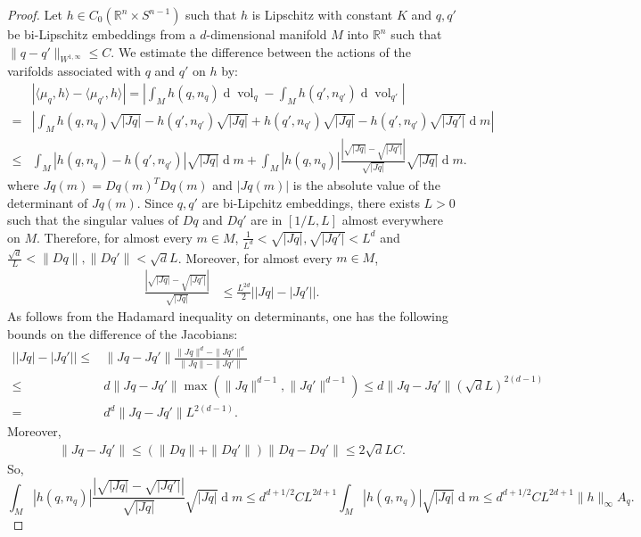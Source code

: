 \documentclass[11pt]{article}
\newcommand{\R}{\mathbb{R}}
\begin{document}
\begin{proof}
    Let $h\in C_0(\R^n\times S^{n-1})$ such that $h$ is Lipschitz with constant $K$ and $q,q'$ be bi-Lipschitz embeddings from a $d$-dimensional manifold $M$ into $\R^{n}$ such that $\|q - q'\|_{W^{1,\infty}} \leq C$. We estimate the difference between the actions of the varifolds associated with $q$ and $q'$ on $h$ by:
\begin{align}    
    &|\langle\mu_q,h\rangle-\langle\mu_{q'},h\rangle|= \left|\int_{M} h(q,n_{q}) \operatorname{d} \operatorname{vol}_q -  \int_{M}h(q',n_{q'}) \operatorname{d}\operatorname{vol}_{q'}\right|\\
    =&\left|\int_{M} h(q,n_{q})\sqrt{|Jq|} - h(q',n_{q'})\sqrt{|Jq|}+ h(q',n_{q'})\sqrt{|Jq|} - h(q',n_{q'})\sqrt{|Jq'|} \operatorname{d}m\right|\\
    \leq&\int_{M} \left|h(q,n_q)-h(q',n_{q'})\right| \sqrt{|Jq|} \operatorname{d}m + \int_{M} |h(q,n_q)|\frac{\left|\sqrt{|Jq|}-\sqrt{|Jq'|}\right|}{\sqrt{|Jq|}} \sqrt{|Jq|}\operatorname{d}m.
\end{align}
where $Jq(m)=Dq(m)^T Dq(m)$ and $|Jq(m)|$ is the absolute value of the determinant of $Jq(m)$. Since $q,q'$ are bi-Lipchitz embeddings, there exists $L>0$ such that the singular values of $Dq$ and $Dq'$ are in $[1/L,L]$ almost everywhere on $M$. Therefore, for almost every $m\in M$, $\frac{1}{L^d}<\sqrt{|Jq|},\sqrt{|Jq'|}<L^d$ and $\frac{\sqrt{d}}{L}<\|Dq\|,\|Dq'\|<\sqrt{d}L$.
Moreover, for almost every $m\in M$, 
\begin{align*}
    \frac{\left|\sqrt{|Jq|}-\sqrt{|Jq'|}\right|}{\sqrt{|Jq|}} &\leq \frac{L^{2d}}{2}\left||Jq|-|Jq'|\right|.
\end{align*}
As follows from the Hadamard inequality on determinants, one has the following bounds on the difference of the Jacobians:
\begin{align*}
    \left||Jq|-|Jq'|\right|\leq& \|Jq-Jq'\| \frac{\|Jq\|^d-\|Jq'\|^d}{\|Jq\|-\|Jq'\|} \\
    \leq& d \|Jq-Jq'\| \max\left(\|Jq\|^{d-1},\|Jq'\|^{d-1}\right)\leq d \|Jq-Jq'\| (\sqrt{d}L)^{2(d-1)}\\
    =&d^d \|Jq-Jq'\| L^{2(d-1)}.
\end{align*} 
Moreover,
\begin{align*}
    \|Jq-Jq'\|\leq (\|Dq\|+\|Dq'\|)\|Dq-Dq'\|\leq 2\sqrt{d}LC.
\end{align*}
So,
\begin{equation*}
    \int_{M} |h(q,n_q)|\frac{\left|\sqrt{|Jq|}-\sqrt{|Jq'|}\right|}{\sqrt{|Jq|}} \sqrt{|Jq|}\operatorname{d}m\leq d^{d+1/2}CL^{2d+1}\int_M |h(q,n_q)|\sqrt{|Jq|}\operatorname{d}m \leq d^{d+1/2}CL^{2d+1}\|h\|_{\infty}A_q.

\end{equation*}
\end{proof}
\end{document}
